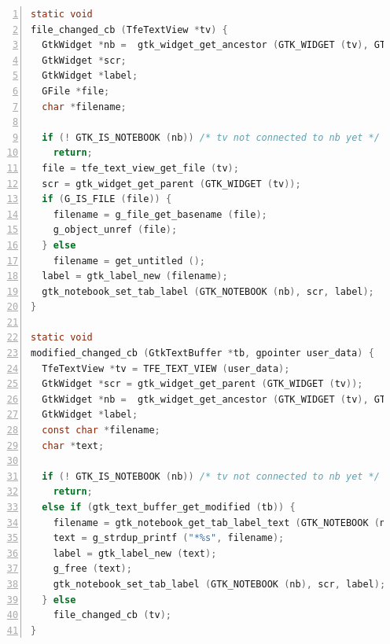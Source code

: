 \begin{lstlisting}[language=C, numbers=left]
static void
file_changed_cb (TfeTextView *tv) {
  GtkWidget *nb =  gtk_widget_get_ancestor (GTK_WIDGET (tv), GTK_TYPE_NOTEBOOK);
  GtkWidget *scr;
  GtkWidget *label;
  GFile *file;
  char *filename;

  if (! GTK_IS_NOTEBOOK (nb)) /* tv not connected to nb yet */
    return;
  file = tfe_text_view_get_file (tv);
  scr = gtk_widget_get_parent (GTK_WIDGET (tv));
  if (G_IS_FILE (file)) {
    filename = g_file_get_basename (file);
    g_object_unref (file);
  } else
    filename = get_untitled ();
  label = gtk_label_new (filename);
  gtk_notebook_set_tab_label (GTK_NOTEBOOK (nb), scr, label);
}

static void
modified_changed_cb (GtkTextBuffer *tb, gpointer user_data) {
  TfeTextView *tv = TFE_TEXT_VIEW (user_data);
  GtkWidget *scr = gtk_widget_get_parent (GTK_WIDGET (tv));
  GtkWidget *nb =  gtk_widget_get_ancestor (GTK_WIDGET (tv), GTK_TYPE_NOTEBOOK);
  GtkWidget *label;
  const char *filename;
  char *text;

  if (! GTK_IS_NOTEBOOK (nb)) /* tv not connected to nb yet */
    return;
  else if (gtk_text_buffer_get_modified (tb)) {
    filename = gtk_notebook_get_tab_label_text (GTK_NOTEBOOK (nb), scr);
    text = g_strdup_printf ("*%s", filename);
    label = gtk_label_new (text);
    g_free (text);
    gtk_notebook_set_tab_label (GTK_NOTEBOOK (nb), scr, label);
  } else
    file_changed_cb (tv);
}
\end{lstlisting}

